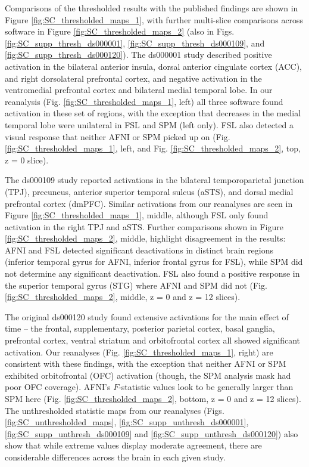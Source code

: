 Comparisons of the thresholded results with the published findings are shown in Figure \ref{fig:SC_thresholded_maps_1}, with further multi-slice comparisons across software in Figure \ref{fig:SC_thresholded_maps_2} (also in Figs. \ref{fig:SC_supp_thresh_ds000001}, \ref{fig:SC_supp_thresh_ds000109}, and \ref{fig:SC_supp_thresh_ds000120}). The ds000001 study described positive activation in the bilateral anterior insula, dorsal anterior cingulate cortex (ACC), and right dorsolateral prefrontal cortex, and negative activation in the ventromedial prefrontal cortex and bilateral medial temporal lobe. In our reanalysis (Fig.  \ref{fig:SC_thresholded_maps_1}, left) all three software found activation in these set of regions, with the exception that decreases in the medial temporal lobe were unilateral in FSL and SPM (left only). FSL also detected a visual response that neither AFNI or SPM picked up on (Fig.  \ref{fig:SC_thresholded_maps_1},  left, and Fig.  \ref{fig:SC_thresholded_maps_2}, top, z = 0 slice).

The ds000109 study reported activations in the bilateral temporoparietal junction (TPJ), precuneus, anterior superior temporal sulcus (aSTS), and dorsal medial prefrontal cortex (dmPFC). Similar activations from our reanalyses are seen in Figure \ref{fig:SC_thresholded_maps_1}, middle, although FSL only found activation in the right TPJ and aSTS. Further comparisons shown in Figure \ref{fig:SC_thresholded_maps_2}, middle, highlight disagreement in the results: AFNI and FSL detected significant deactivations in distinct brain regions (inferior temporal gyrus for AFNI, inferior frontal gyrus for FSL), while SPM did not determine any significant deactivation. FSL also found a positive response in the superior temporal gyrus  (STG) where AFNI and SPM did not (Fig. \ref{fig:SC_thresholded_maps_2}, middle, z = 0 and z = 12 slices).

The original ds000120 study found extensive activations for the main effect of time -- the frontal, supplementary, posterior parietal cortex, basal ganglia, prefrontal cortex, ventral striatum and orbitofrontal cortex all showed significant activation. Our reanalyses (Fig. \ref{fig:SC_thresholded_maps_1}, right) are consistent with these findings, with the exception that neither AFNI or SPM exhibited orbitofrontal (OFC) activation (though, the SPM  analysis mask had poor OFC coverage). AFNI's $F$-statistic values look to be generally larger than SPM here (Fig. \ref{fig:SC_thresholded_maps_2}, bottom, z = 0 and z = 12 slices). The unthresholded statistic maps from our reanalyses (Figs. \ref{fig:SC_unthresholded_maps}, \ref{fig:SC_supp_unthresh_ds000001}, \ref{fig:SC_supp_unthresh_ds000109} and \ref{fig:SC_supp_unthresh_ds000120}) also show that while extreme values display moderate agreement, there are considerable differences across the brain in each given study.

